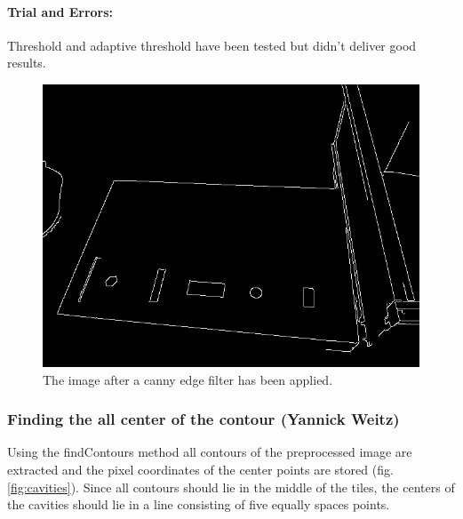 \documentclass{article}
\begin{document}
\paragraph*{Trial and Errors:} Threshold and adaptive threshold have been tested but didn't deliver good results.\\
\begin{figure}[h!]
\centering
\includegraphics[scale=0.3]{images/edges.jpg}
\caption{The image after a canny edge filter has been applied.}
\label{fig:edges}
\end{figure}

\subsubsection*{Finding the all center of the contour (Yannick Weitz)}
Using the findContours method all contours of the preprocessed image are extracted and the pixel coordinates of the center points are stored (fig. \ref{fig:cavities}). Since all contours should lie in the middle of the tiles, the centers of the cavities should lie in a line consisting of five equally spaces points. \\
\end{document}
